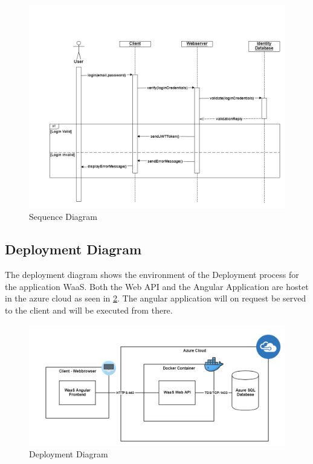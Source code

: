 \documentclass[titlepage, 12pt]{article}
\begin{document}
\begin{figure}[H]
  \includegraphics[width=0.95\linewidth]{SequenceDiagram.png}
  \caption{Sequence Diagram}
  \label{fig:sequenceDiagram}
\end{figure}

\subsection{Deployment Diagram}
The deployment diagram shows the environment of the Deployment process for the application WaaS. Both the Web API and the Angular Application are hostet in the azure cloud as seen in \ref{fig:deploymentDiagram}. The angular application will on request be served to the client and will be executed from there.

\begin{figure}[H]
  \includegraphics[width=0.95\linewidth]{DeploymentDiagram.png}
  \caption{Deployment Diagram}
  \label{fig:deploymentDiagram}
\end{figure}
\end{document}
